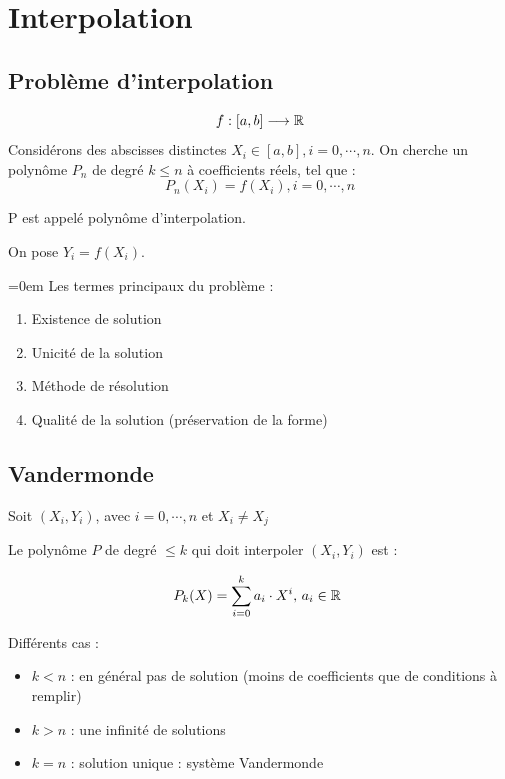 \chapter{Interpolation}

\section* {Problème d'interpolation}
\begin{equation}
    f : [a,b] \longrightarrow \mathbb{R}
\end{equation}
Considérons des abscisses distinctes $X_i \in [a,b], i = 0,\cdots,n $.
\newline
On cherche un polynôme $P_n$ de degré $k \le n$ à coefficients réels, tel que :
\begin{equation}
    P_n(X_i) = f(X_i), i = 0,\cdots,n
\end{equation}

\begin{fdef}
    P est appelé polynôme d'interpolation.
\end{fdef}

On pose $Y_i = f(X_i)$.


\bigbreak
\bigbreak
\parindent=0em
Les termes principaux du problème :
\begin{enumerate}
\item Existence de solution
\item Unicité de la solution
\item Méthode de résolution
\item Qualité de la solution (préservation de la forme)
\end{enumerate}


\newpage

\section {Vandermonde}

Soit $(X_i, Y_i)$, avec $i = 0,\cdots,n$ et $X_i \ne X_j$

Le polynôme $P$ de degré $\le k$ qui doit interpoler $(X_i, Y_i)$ est :

\begin{equation}
    P_k(X) = \sum_{i = 0}^k a_i \cdot X^i \text{, $a_i \in \mathbb{R}$ }
\end{equation}


Différents cas :
\begin{itemize}
\item $k < n$ : en général pas de solution (moins de coefficients que de conditions à remplir)
\item $k > n$ : une infinité de solutions
\item $k = n$ : solution unique : système Vandermonde
\end{itemize}

